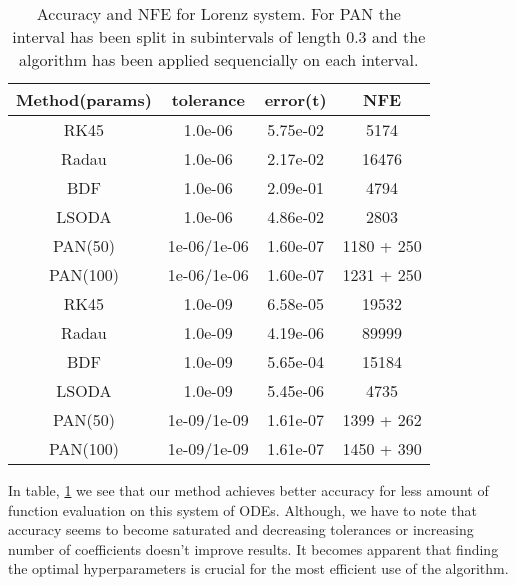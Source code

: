 \documentclass[11pt]{article}
\begin{document}
    \begin{table}[!h]
        \begin{center}
            \caption{Accuracy and NFE for Lorenz system. For PAN the interval has been split in subintervals of length
                $0.3$ and the algorithm has been applied sequencially on each interval.}
            \label{lorenz_metric}
            \renewcommand{\arraystretch}{1.5}
            \renewcommand{\tabcolsep}{10.25pt}
            \begin{tabular}{|c|c|c|c|}
                \hline
                Method(params) & tolerance & error(t) & NFE \\
                \hline
                RK45 & 1.0e-06 & 5.75e-02 & 5174
                \\ \hline
                Radau & 1.0e-06 & 2.17e-02 & 16476
                \\ \hline
                BDF & 1.0e-06 & 2.09e-01 & 4794
                \\ \hline
                LSODA & 1.0e-06 & 4.86e-02 & 2803
                \\ \hline
                PAN(50) & 1e-06/1e-06 & 1.60e-07 & 1180 + 250
                \\ \hline
                PAN(100) & 1e-06/1e-06 & 1.60e-07 & 1231 + 250
                \\ \hline\hline
                RK45 & 1.0e-09 & 6.58e-05 & 19532
                \\ \hline
                Radau & 1.0e-09 & 4.19e-06 & 89999
                \\ \hline
                BDF & 1.0e-09 & 5.65e-04 & 15184
                \\ \hline
                LSODA & 1.0e-09 & 5.45e-06 & 4735
                \\ \hline
                PAN(50) & 1e-09/1e-09 & 1.61e-07 & 1399 + 262
                \\ \hline
                PAN(100) & 1e-09/1e-09 & 1.61e-07 & 1450 + 390
                \\ \hline
            \end{tabular}
        \end{center}
    \end{table}

    In table, \ref{lorenz_metric} we see that our method achieves better accuracy for less amount of function
    evaluation on this system of ODEs.
    Although, we have to note that accuracy seems to become saturated and decreasing tolerances or increasing number
    of coefficients doesn't improve results.
    It becomes apparent that finding the optimal hyperparameters is crucial for the most efficient use of the algorithm.
\end{document}
